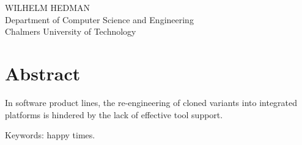 \fullt\\
\subt\\
WILHELM HEDMAN\\
Department of Computer Science and Engineering\\
Chalmers University of Technology \setlength{\parskip}{0.5cm}

\thispagestyle{plain}			%
\setlength{\parskip}{0pt plus 1.0pt}
\section*{Abstract}
In software product lines, the re-engineering of cloned variants into integrated platforms is hindered by the lack of effective tool support. 

\vfill
Keywords: happy times.

\newpage				%
\thispagestyle{empty}
\mbox{}